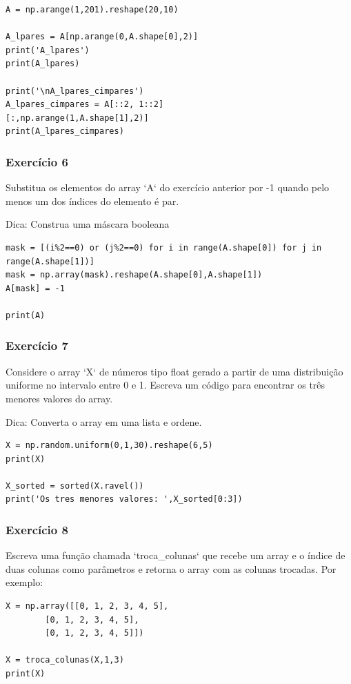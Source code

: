 \documentclass[../numerical_methods.tex]{subfiles}
\begin{document}
\begin{verbatim}
A = np.arange(1,201).reshape(20,10)

A_lpares = A[np.arange(0,A.shape[0],2)]
print('A_lpares')
print(A_lpares)

print('\nA_lpares_cimpares')
A_lpares_cimpares = A[::2, 1::2]
[:,np.arange(1,A.shape[1],2)]
print(A_lpares_cimpares)
\end{verbatim}


\subsubsection{Exercício 6}
Substitua os elementos do array `A` do exercício anterior por -1 quando pelo menos um dos índices do elemento é par.

Dica: Construa uma máscara booleana

\begin{verbatim}
mask = [(i%2==0) or (j%2==0) for i in range(A.shape[0]) for j in range(A.shape[1])]
mask = np.array(mask).reshape(A.shape[0],A.shape[1])
A[mask] = -1

print(A)
\end{verbatim}


\subsubsection{Exercício 7}
Considere o array `X` de números tipo float gerado a partir de uma distribuição uniforme no intervalo entre 0 e 1. Escreva um código para encontrar os três menores valores do array.

Dica: Converta o array em uma lista e ordene.

\begin{verbatim}
X = np.random.uniform(0,1,30).reshape(6,5)
print(X)

X_sorted = sorted(X.ravel())
print('Os tres menores valores: ',X_sorted[0:3])
\end{verbatim}


\subsubsection{Exercício 8}
Escreva uma função chamada `troca\_colunas` que recebe um array e o índice de duas colunas como parâmetros e retorna o array com as colunas trocadas. Por exemplo:
\begin{verbatim}
X = np.array([[0, 1, 2, 3, 4, 5],
		[0, 1, 2, 3, 4, 5],
		[0, 1, 2, 3, 4, 5]])

X = troca_colunas(X,1,3)
print(X)
\end{verbatim}
\end{document}
